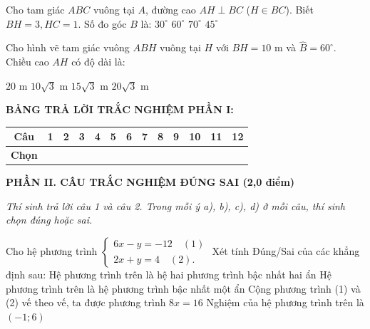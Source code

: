 \documentclass[12pt,a4paper]{article}
\begin{document}
\begin{ex}
Cho tam giác $ABC$ vuông tại $A$, đường cao $AH \perp BC$ ($H \in BC$). Biết $BH = 3, HC = 1$. Số đo góc $B$ là:
\choice
{\True $30^\circ$}
{$60^\circ$}
{$70^\circ$}
{$45^\circ$}
\end{ex}

\begin{ex}
Cho hình vẽ tam giác vuông $ABH$ vuông tại $H$ với $BH = 10\text{ m}$ và $\widehat{B} = 60^\circ$. Chiều cao $AH$ có độ dài là:
\begin{center}
\end{center}
\choice
{$20\text{ m}$}
{\True $10\sqrt{3}\text{ m}$}
{$15\sqrt{3}\text{ m}$}
{$20\sqrt{3}\text{ m}$}
\end{ex}


\vspace{1mm}
\noindent\textbf{BẢNG TRẢ LỜI TRẮC NGHIỆM PHẦN I:}
\begin{center}
\begin{tabular}{|c|c|c|c|c|c|c|c|c|c|c|c|c|}
\hline
\textbf{Câu} & \textbf{1} & \textbf{2} & \textbf{3} & \textbf{4} & \textbf{5} & \textbf{6} & \textbf{7} & \textbf{8} & \textbf{9} & \textbf{10} & \textbf{11} & \textbf{12} \\
\hline
\textbf{Chọn} & \rule{0pt}{0.65cm} & & & & & & & & & & & \\
\hline
\end{tabular}
\end{center}
\vspace{2mm}

\setcounter{ex}{0}
\noindent\textbf{\large PHẦN II. CÂU TRẮC NGHIỆM ĐÚNG SAI (2,0 điểm)}

\textit{Thí sinh trả lời câu 1 và câu 2. Trong mỗi ý a), b), c), d) ở mỗi câu, thí sinh chọn đúng hoặc sai.}

\vspace{1mm}
\begin{ex}
Cho hệ phương trình $\begin{cases} 6x - y = -12 \quad (1) \\ 2x + y = 4 \quad (2). \end{cases}$ Xét tính Đúng/Sai của các khẳng định sau:
\choiceTF
{\True Hệ phương trình trên là hệ hai phương trình bậc nhất hai ẩn}
{Hệ phương trình trên là hệ phương trình bậc nhất một ẩn}
{Cộng phương trình (1) và (2) vế theo vế, ta được phương trình $8x = 16$}
{\True Nghiệm của hệ phương trình trên là $(-1; 6)$}
\end{ex}
\end{document}
